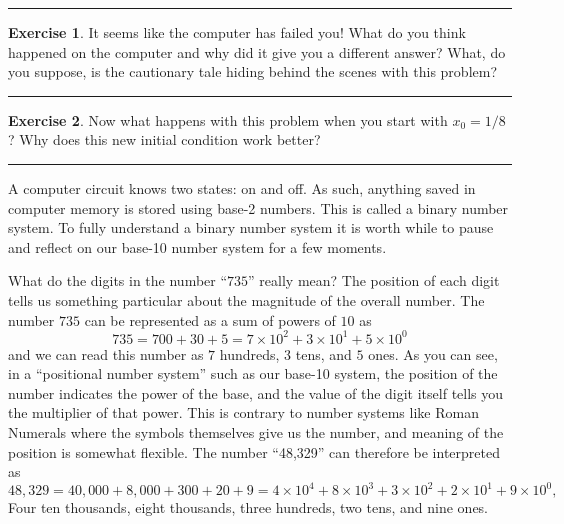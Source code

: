 \documentclass[
]{book}
\theoremstyle{definition}
\theoremstyle{definition}
\theoremstyle{definition}
\newtheorem{exercise}{Exercise}[chapter]
\theoremstyle{remark}
\begin{document}
\begin{center}\rule{0.5\linewidth}{0.5pt}\end{center}

\begin{exercise}
\protect\hypertarget{exr:unnamed-chunk-6}{}{\label{exr:unnamed-chunk-6} }It seems like the computer has failed you!
What do you think happened on the computer and why did it give you a
different answer? What, do you suppose, is the cautionary tale hiding
behind the scenes with this problem?
\end{exercise}

\begin{center}\rule{0.5\linewidth}{0.5pt}\end{center}

\begin{exercise}
\protect\hypertarget{exr:unnamed-chunk-7}{}{\label{exr:unnamed-chunk-7} }Now what happens with this problem when you start with \(x_0 = 1/8\)? Why
does this new initial condition work better?
\end{exercise}

\begin{center}\rule{0.5\linewidth}{0.5pt}\end{center}

A computer circuit knows two states: on and off. As such, anything saved
in computer memory is stored using base-2 numbers. This is called a
binary number system. To fully understand a binary number system it is
worth while to pause and reflect on our base-10 number system for a few
moments.

What do the digits in the number ``\(735\)'' really mean? The position of
each digit tells us something particular about the magnitude of the
overall number. The number \(735\) can be represented as a sum of powers
of \(10\) as
\[735 = 700 + 30 + 5 =  7 \times 10^2 + 3 \times 10^1 + 5 \times 10^0\]
and we can read this number as \(7\) hundreds, \(3\) tens, and \(5\) ones. As
you can see, in a ``positional number system'' such as our base-10 system,
the position of the number indicates the power of the base, and the
value of the digit itself tells you the multiplier of that power. This
is contrary to number systems like Roman Numerals where the symbols
themselves give us the number, and meaning of the position is somewhat
flexible. The number ``48,329'' can therefore be interpreted as
\[48,329 = 40,000 + 8,000 + 300 + 20 + 9 = 4 \times 10^4 + 8 \times 10^3 + 3 \times 10^2 + 2
\times 10^1 + 9 \times 10^0,\] Four ten thousands, eight thousands,
three hundreds, two tens, and nine ones.
\end{document}
